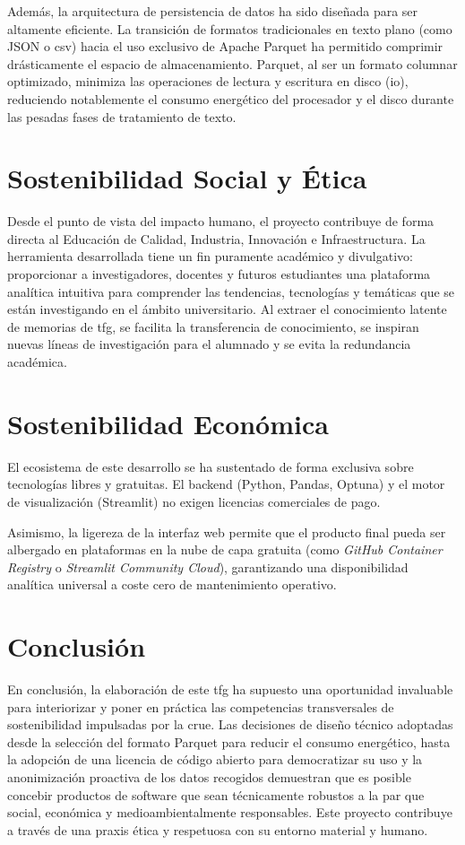 Además, la arquitectura de persistencia de datos ha sido diseñada para ser
altamente eficiente. La transición de formatos tradicionales en texto plano
(como JSON o \acrshort{csv}) hacia el uso exclusivo de Apache Parquet ha
permitido comprimir drásticamente el espacio de almacenamiento. Parquet, al ser
un formato columnar optimizado, minimiza las operaciones de lectura y escritura
en disco (\acrshort{io}), reduciendo notablemente el consumo energético del
procesador y el disco durante las pesadas fases de tratamiento de texto.

\section{Sostenibilidad Social y Ética}
Desde el punto de vista del impacto humano, el proyecto contribuye de forma
directa al Educación de Calidad, Industria, Innovación e Infraestructura. La
herramienta desarrollada tiene un fin puramente académico y divulgativo:
proporcionar a investigadores, docentes y futuros estudiantes una plataforma
analítica intuitiva para comprender las tendencias, tecnologías y temáticas que
se están investigando en el ámbito universitario. Al extraer el conocimiento
latente de memorias de \Acrshort{tfg}, se facilita la transferencia de
conocimiento, se inspiran nuevas líneas de investigación para el alumnado y se
evita la redundancia académica.

\section{Sostenibilidad Económica}
El ecosistema de este desarrollo se ha sustentado de forma exclusiva sobre
tecnologías libres y gratuitas. El backend (Python, Pandas, Optuna) y el motor
de visualización (Streamlit) no exigen licencias comerciales de pago.

Asimismo, la ligereza de la interfaz web permite que el producto final pueda
ser albergado en plataformas en la nube de capa gratuita (como \textit{GitHub
    Container Registry} o \textit{Streamlit Community Cloud}), garantizando una
disponibilidad analítica universal a coste cero de mantenimiento operativo.

\section{Conclusión}
En conclusión, la elaboración de este \Acrshort{tfg} ha supuesto una
oportunidad invaluable para interiorizar y poner en práctica las competencias
transversales de sostenibilidad impulsadas por la \acrshort{crue}. Las
decisiones de diseño técnico adoptadas desde la selección del formato Parquet
para reducir el consumo energético, hasta la adopción de una licencia de código
abierto para democratizar su uso y la anonimización proactiva de los datos
recogidos demuestran que es posible concebir productos de software que sean
técnicamente robustos a la par que social, económica y medioambientalmente
responsables. Este proyecto contribuye a través de una praxis ética y
respetuosa con su entorno material y humano.
